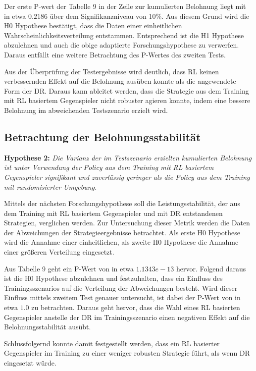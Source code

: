 Der erste P-wert der Tabelle 9 in der Zeile zur kumulierten Belohnung liegt mit in etwa $0.2186$ über dem Signifikanzniveau von 10\%.
Aus diesem Grund wird die H0 Hypothese bestätigt, dass die Daten einer einheitlichen Wahrscheinlichkeitsverteilung entstammen.
Entsprechend ist die H1 Hypothese abzulehnen und auch die obige adaptierte Forschungshypothese zu verwerfen.
Daraus entfällt eine weitere Betrachtung des P-Wertes des zweiten Tests.

Aus der Überprüfung der Testergebnisse wird deutlich, dass RL keinen verbessernden Effekt auf die Belohnung ausüben konnte als die angewendete Form der DR.
Daraus kann ableitet werden, dass die Strategie aus dem Training mit RL basiertem Gegenspieler nicht robuster agieren konnte, indem eine bessere Belohnung im abweichenden Testszenario erzielt wird.

\subsection{Betrachtung der Belohnungsstabilität}

\textbf{Hypothese 2:}
\textit{Die Varianz der im Testszenario erzielten kumulierten Belohnung ist unter Verwendung der Policy aus dem Training mit RL basiertem Gegenspieler signifikant und zuverlässig geringer als die Policy aus dem Training mit randomisierter Umgebung.}

Mittels der nächsten Forschungshypothese soll die Leistungsstabilität, der aus dem Training mit RL basiertem Gegenspieler und mit DR entstandenen Strategien, verglichen werden.
Zur Untersuchung dieser Metrik werden die Daten der Abweichungen der Strategieergebnisse betrachtet.
Als erste H0 Hypothese wird die Annahme einer einheitlichen, als zweite H0 Hypothese die Annahme einer größeren Verteilung eingesetzt.

Aus Tabelle 9 geht ein P-Wert von in etwa $1.1343e-13$ hervor.
Folgend daraus ist die H0 Hypothese abzulehnen und festzuhalten, dass ein Einfluss des Trainingsszenarios auf die Verteilung der Abweichungen besteht.
Wird dieser Einfluss mittels zweitem Test genauer untersucht, ist dabei der P-Wert von in etwa $1.0$ zu betrachten.
Daraus geht hervor, dass die Wahl eines RL basierten Gegenspieler anstelle der DR im Trainingsszenario einen negativen Effekt auf die Belohnungsstabilität ausübt.

Schlussfolgernd konnte damit festgestellt werden, dass ein RL basierter Gegenspieler im Training zu einer weniger robusten Strategie führt, als wenn DR eingesetzt würde.

